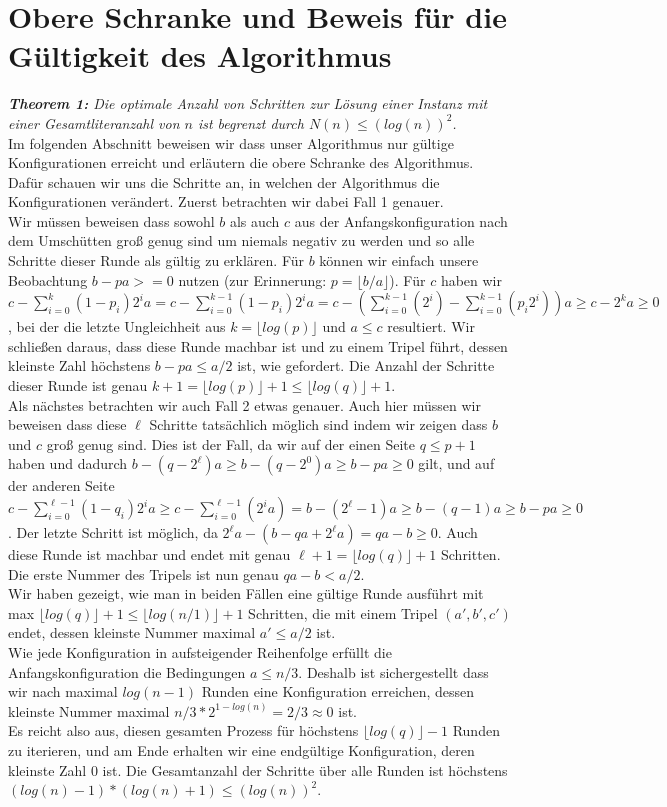 \chapter{Obere Schranke und Beweis für die Gültigkeit des Algorithmus} 
\textit{\textbf{Theorem 1:} Die optimale Anzahl von Schritten zur Lösung einer Instanz mit einer Gesamtliteranzahl von $n$ ist begrenzt durch $N(n) \leq (log(n))^2$.} \\

Im folgenden Abschnitt beweisen wir dass unser Algorithmus nur gültige Konfigurationen erreicht und erläutern die obere Schranke des Algorithmus. Dafür schauen wir uns die Schritte an, in welchen der Algorithmus die Konfigurationen verändert. Zuerst betrachten wir dabei Fall 1 genauer. \\
Wir müssen beweisen dass sowohl $b$ als auch $c$ aus der Anfangskonfiguration nach dem Umschütten groß genug sind um niemals negativ zu werden und so alle Schritte dieser Runde als gültig zu erklären. Für $b$ können wir einfach unsere Beobachtung $b-pa>=0$ nutzen (zur Erinnerung: $p=\lfloor b/a \rfloor$). 
Für $c$ haben wir $c-\sum_{i=0}^{k} (1-p_i) 2^i a = c-\sum_{i=0}^{k-1} (1-p_i) 2^i a = c-(\sum_{i=0}^{k-1} (2^i) - \sum_{i=0}^{k-1} (p_i 2^i))a \geq c-2^k a \geq 0$, bei der die letzte Ungleichheit aus $k=\lfloor log(p)\rfloor$ und $a \leq c$ resultiert. 
Wir schließen daraus, dass diese Runde machbar ist und zu einem Tripel führt, dessen kleinste Zahl höchstens $b-pa \leq a/2$  ist, wie gefordert. Die Anzahl der Schritte dieser Runde ist genau $k+1 = \lfloor log(p)\rfloor +1\leq \lfloor log(q)\rfloor +1$. \\

Als nächstes betrachten wir auch Fall 2 etwas genauer. Auch hier müssen wir beweisen dass diese $\ell$ Schritte tatsächlich möglich sind indem wir zeigen dass $b$ und $c$ groß genug sind. Dies ist der Fall, da wir auf der einen Seite $q \leq p+1$ haben und dadurch $b-(q-2^\ell)a \geq b-(q-2^0)a \geq b-pa \geq 0$ gilt, 
und auf der anderen Seite $c - \sum_{i=0}^{\ell -1} (1-q_i)2^ia \geq c-\sum_{i=0}^{\ell -1} (2^ia) = b-(2^\ell-1)a \geq b-(q-1)a \geq b-pa \geq 0$. Der letzte Schritt ist möglich, da $2^\ell a-(b-qa+2^\ell a)=qa-b \geq 0$.
Auch diese Runde ist machbar und endet mit genau $\ell+1=\lfloor log(q)\rfloor+1$ Schritten. Die erste Nummer des Tripels ist nun genau $qa-b<a/2$. \\

Wir haben gezeigt, wie man in beiden Fällen eine gültige Runde ausführt mit max $\lfloor log(q)\rfloor +1\leq \lfloor log(n/1)\rfloor +1$ Schritten, die mit einem Tripel $(a', b', c')$ endet, dessen kleinste Nummer maximal $a'\leq a/2$ ist. \\
Wie jede Konfiguration in aufsteigender Reihenfolge erfüllt die Anfangskonfiguration die Bedingungen $a \leq n/3$. Deshalb ist sichergestellt dass wir nach maximal $log(n-1)$ Runden eine Konfiguration erreichen, dessen kleinste Nummer maximal $n/3 * 2^{1-log(n)}=2/3 \approx 0$ ist. \\
Es reicht also aus, diesen gesamten Prozess für höchstens $\lfloor log(q)\rfloor -1$ Runden zu iterieren, und am Ende erhalten wir eine endgültige Konfiguration, deren kleinste Zahl $0$ ist. Die Gesamtanzahl der Schritte über alle Runden ist höchstens $(log(n)-1)*(log(n)+1) \leq (log(n))^2$. 